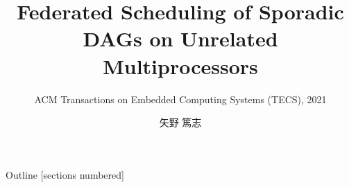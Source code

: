 \newcommand{\beamerDir}[0]{/mnt/c/Users/atsushi/Documents/workspace/env/Beamer/beamer/beamer/}





\newcommand{\forme}[1]{}


\title{Federated Scheduling of Sporadic DAGs on Unrelated Multiprocessors}
\subtitle{ACM Transactions on Embedded Computing Systems (TECS), 2021}
\author{矢野 篤志}




\maketitle



\begin{frame}{Outline}
    [sections numbered]
    \small\tableofcontents[hideallsubsections]
\end{frame}











\lastpage

%     
%     


